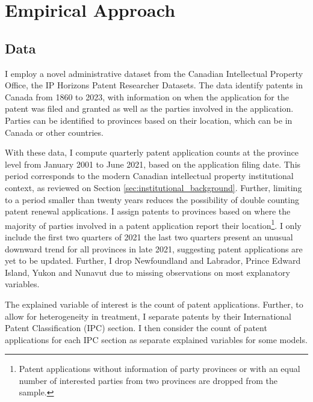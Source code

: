 \documentclass[../main.tex]{subfiles}
\begin{document}
\section{Empirical Approach}
\label{sec:empirical_strategy}

\subsection{Data}

I employ a novel administrative dataset from the Canadian Intellectual Property Office, the IP Horizons Patent Researcher Datasets\nocite{canadianintellectualpropertyoffice23}. The data identify patents in Canada from 1860 to 2023, with information on when the application for the patent was filed and granted as well as the parties involved in the application. Parties can be identified to provinces based on their location, which can be in Canada or other countries. 


With these data, I compute quarterly patent application counts at the province level from January 2001 to June 2021, based on the application filing date. This period corresponds to the modern Canadian intellectual property institutional context, as reviewed on Section \ref{sec:institutional_background}. Further, limiting to a period smaller than twenty years reduces the possibility of double counting patent renewal applications. I assign patents to provinces based on where the majority of parties involved in a patent application report their location\footnote{Patent applications without information of party provinces or with an equal number of interested parties from two provinces are dropped from the sample.}. I only include the first two quarters of 2021 the last two quarters present an unusual downward trend for all provinces in late 2021, suggesting patent applications are yet to be updated. Further, I drop Newfoundland and Labrador, Prince Edward Island, Yukon and Nunavut due to missing observations on most explanatory variables. 


The explained variable of interest is the count of patent applications. Further, to allow for heterogeneity in treatment, I separate patents by their International Patent Classification (IPC) section. I then consider the count of patent applications for each IPC section as separate explained variables for some models.
\end{document}
